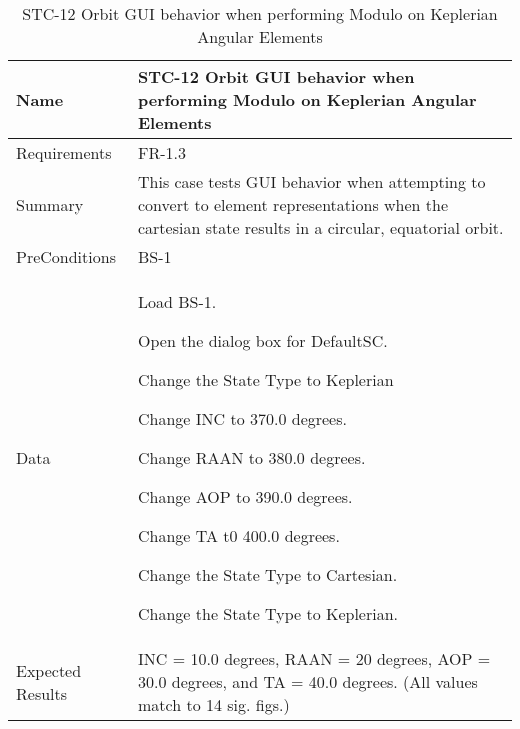 




\begin{table}[htbp!]
\centering
      \begin{tabular}{|p{1.05 in} |p{4.75 in} |}
      \hline
         \rowcolor[rgb]{0.8,0.8,0.8} Name & STC-12 Orbit GUI behavior when performing Modulo on Keplerian Angular Elements\\
         \hline
         Requirements & FR-1.3\\  \hline
         Summary &
         This  case tests GUI behavior when attempting to convert to element representations when the
         cartesian state results in a circular, equatorial orbit.
         \\     \hline
         PreConditions & BS-1\\     \hline
         Data &
         \begin{compactenum}
             \item Load BS-1.
             \item Open the dialog box for DefaultSC.
             \item Change the State Type to Keplerian
             \item Change INC to 370.0 degrees.
             \item Change RAAN to 380.0 degrees.
             \item Change AOP to 390.0 degrees.
             \item Change TA t0 400.0 degrees.
             \item Change the State Type to Cartesian.
             \item Change the State Type to Keplerian.
         \end{compactenum}
         \\ \hline
         Expected Results & INC = 10.0 degrees, RAAN = 20 degrees, AOP = 30.0 degrees, and TA = 40.0 degrees. (All
         values match to 14 sig. figs.)\\
      \hline
      \end{tabular}
      \label{Table:STC-12}
      \caption{STC-12 Orbit GUI behavior when performing Modulo on Keplerian Angular Elements}
\end{table} 